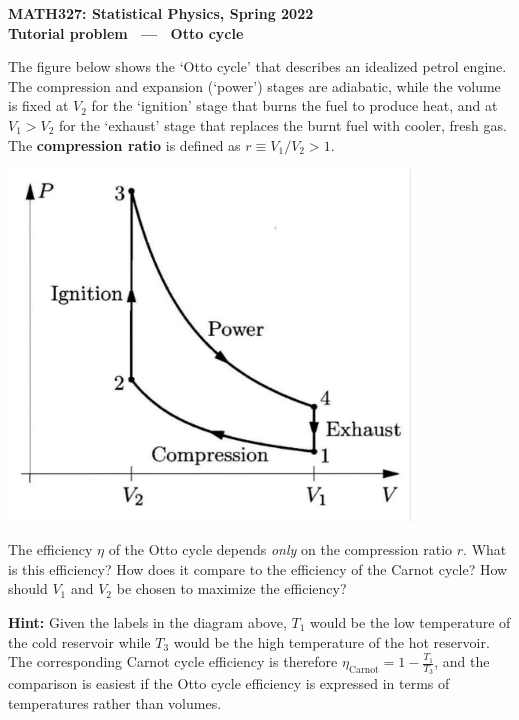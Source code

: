 \documentclass[12 pt]{article} %
\begin{document}
\newcommand{\thisweek}{MATH327 Tutorial (Cycle)}
\newcommand{\moddate}{Last modified 11 Mar.~2022}
\begin{center}
  {\Large \textbf{MATH327: Statistical Physics, Spring 2022}} \\[12 pt]
  {\Large \textbf{Tutorial problem \ --- \ Otto cycle}} \\[24 pt]
\end{center}

The figure below shows the `Otto cycle' that describes an idealized petrol engine.
The compression and expansion (`power') stages are adiabatic, while the volume is fixed at $V_2$ for the `ignition' stage that burns the fuel to produce heat, and at $V_1 > V_2$ for the `exhaust' stage that replaces the burnt fuel with cooler, fresh gas.
The \textbf{compression ratio} is defined as $r \equiv V_1 / V_2 > 1$.

\begin{center}\includegraphics[width=0.8\textwidth]{figs/Otto.pdf}\end{center}

The efficiency $\eta$ of the Otto cycle depends \emph{only} on the compression ratio $r$.
What is this efficiency?
How does it compare to the efficiency of the Carnot cycle?
How should $V_1$ and $V_2$ be chosen to maximize the efficiency?

\textbf{Hint:} Given the labels in the diagram above, $T_1$ would be the low temperature of the cold reservoir while $T_3$ would be the high temperature of the hot reservoir.
The corresponding Carnot cycle efficiency is therefore $\eta_{\text{Carnot}} = 1 - \frac{T_1}{T_3}$, and the comparison is easiest if the Otto cycle efficiency is expressed in terms of temperatures rather than volumes.
\end{document}
